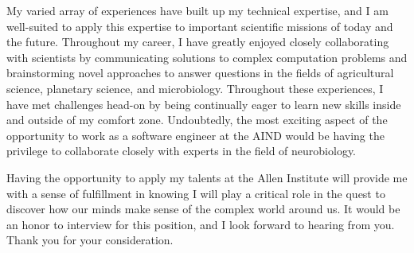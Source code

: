 My varied array of experiences have built up my  technical expertise, and I am well-suited to apply this expertise to important scientific missions of today and the future.
Throughout my career, I have greatly enjoyed closely collaborating with scientists by communicating solutions to complex computation problems and brainstorming novel approaches to answer questions in the fields of agricultural science, planetary science, and microbiology.
Throughout these experiences, I have met challenges head-on by being continually eager to learn new skills inside and outside of my comfort zone.
Undoubtedly, the most exciting aspect of the opportunity to work as a software engineer at the AIND would be having the privilege to collaborate closely with experts in the field of neurobiology.
                        
Having the opportunity to apply my talents at the Allen Institute will provide me with a sense of fulfillment in knowing I will play a critical role in the quest to discover how our minds make sense of the complex world around us.
It would be an honor to interview for this position, and I look forward to hearing from you.
Thank you for your consideration. 
    